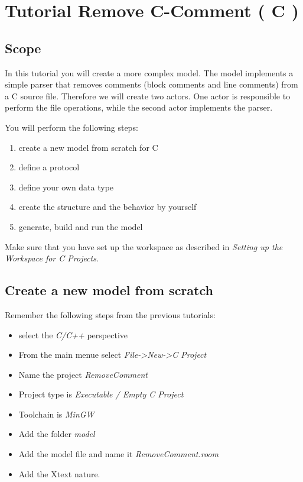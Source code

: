 \chapter{Tutorial Remove C-Comment ( C )}

\section{Scope}

In this tutorial you will create a more complex model. The model implements a simple parser that removes comments (block comments and line comments) from a C source file. Therefore we will create two actors. One actor is responsible to perform the file operations, while the second actor implements the parser.

You will perform the following steps:

\begin{enumerate}
\item create a new model from scratch for C
\item define a protocol
\item define your own data type
\item create the structure and the behavior by yourself
\item generate, build and run the model
\end{enumerate}

Make sure that you have set up the workspace as described in \textit{Setting up the Workspace for C Projects}.

\section{Create a new model from scratch}

Remember the following steps from the previous tutorials:
\begin{itemize}
\item select the \textit{C/C++} perspective
\item From the main menue select \textit{File->New->C Project}
\item Name the project \textit{RemoveComment}
\item Project type is \textit{Executable / Empty C Project}
\item Toolchain is \textit{MinGW}
\item Add the folder \textit{model}
\item Add the model file and name it \textit{RemoveComment.room}
\item Add the Xtext nature.
\end{itemize}

